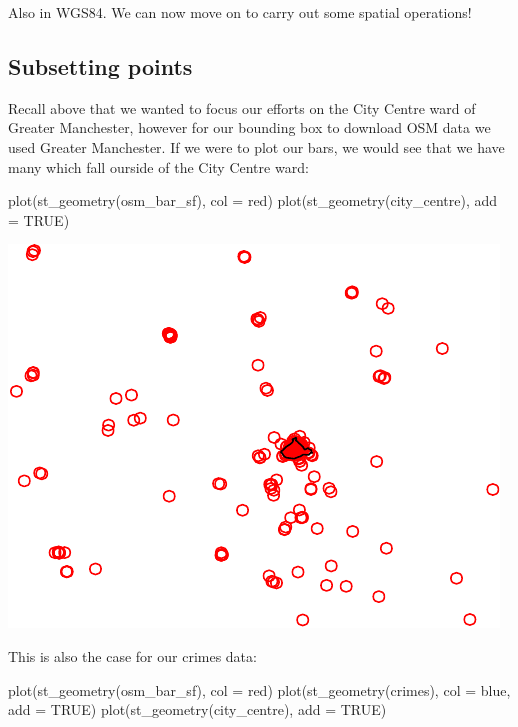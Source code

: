 \documentclass[
]{book}
\newenvironment{Shaded}{\begin{snugshade}}{\end{snugshade}}
\newcommand{\AttributeTok}[1]{\textcolor[rgb]{0.77,0.63,0.00}{#1}}
\newcommand{\ConstantTok}[1]{\textcolor[rgb]{0.00,0.00,0.00}{#1}}
\newcommand{\FunctionTok}[1]{\textcolor[rgb]{0.00,0.00,0.00}{#1}}
\newcommand{\NormalTok}[1]{#1}
\newcommand{\StringTok}[1]{\textcolor[rgb]{0.31,0.60,0.02}{#1}}
\begin{document}
Also in WGS84. We can now move on to carry out some spatial operations!

\hypertarget{subsetting-points}{%
\subsection{Subsetting points}\label{subsetting-points}}

Recall above that we wanted to focus our efforts on the City Centre ward of Greater Manchester, however for our bounding box to download OSM data we used Greater Manchester. If we were to plot our bars, we would see that we have many which fall ourside of the City Centre ward:

\begin{Shaded}
\begin{Highlighting}[]
\FunctionTok{plot}\NormalTok{(}\FunctionTok{st\_geometry}\NormalTok{(osm\_bar\_sf), }\AttributeTok{col =} \StringTok{\textquotesingle{}red\textquotesingle{}}\NormalTok{)}
\FunctionTok{plot}\NormalTok{(}\FunctionTok{st\_geometry}\NormalTok{(city\_centre),  }\AttributeTok{add =} \ConstantTok{TRUE}\NormalTok{)}
\end{Highlighting}
\end{Shaded}

\includegraphics{crime_mapping_files/figure-latex/plot_bars-1.pdf}

This is also the case for our crimes data:

\begin{Shaded}
\begin{Highlighting}[]
\FunctionTok{plot}\NormalTok{(}\FunctionTok{st\_geometry}\NormalTok{(osm\_bar\_sf), }\AttributeTok{col =} \StringTok{\textquotesingle{}red\textquotesingle{}}\NormalTok{)}
\FunctionTok{plot}\NormalTok{(}\FunctionTok{st\_geometry}\NormalTok{(crimes), }\AttributeTok{col =} \StringTok{\textquotesingle{}blue\textquotesingle{}}\NormalTok{, }\AttributeTok{add =} \ConstantTok{TRUE}\NormalTok{)}
\FunctionTok{plot}\NormalTok{(}\FunctionTok{st\_geometry}\NormalTok{(city\_centre), }\AttributeTok{add =} \ConstantTok{TRUE}\NormalTok{)}
\end{Highlighting}
\end{Shaded}
\end{document}
